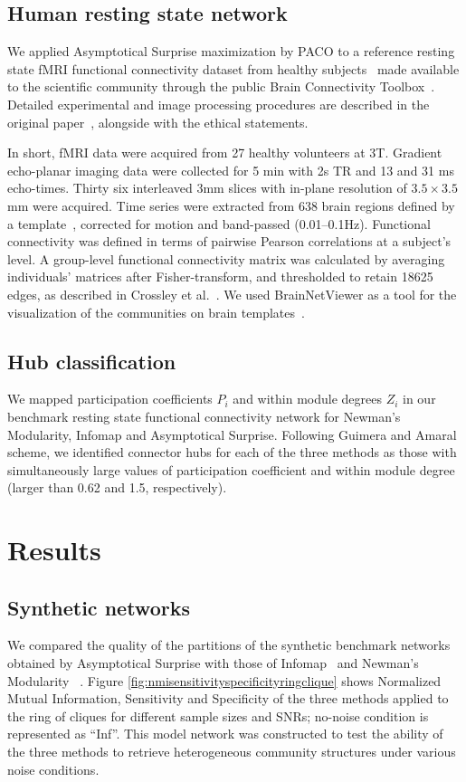 \subsection{Human resting state network}
We applied Asymptotical Surprise maximization by PACO to a reference resting state fMRI functional connectivity dataset from healthy subjects~\cite{crossley2013a} made available to the scientific community through the public Brain Connectivity Toolbox~\cite{rubinov2010}. 
Detailed experimental and image processing procedures are described in the original paper~\cite{crossley2013a}, alongside with the ethical statements.

In short, fMRI data were acquired from 27 healthy volunteers at 3T.
Gradient echo-planar imaging data were collected for 5 min with 2s TR and 13 and 31 ms echo-times. Thirty six interleaved 3mm slices with in-plane resolution of $3.5\times 3.5$ mm were acquired.
Time series were extracted from 638 brain regions defined by a template~\cite{crossley2013a}, corrected for motion and band-passed (0.01–0.1Hz). Functional connectivity was defined in terms of pairwise Pearson correlations at a subject's level.
A group-level functional connectivity matrix was calculated by averaging individuals' matrices after Fisher-transform, and thresholded to retain 18625 edges, as described in Crossley et al.~\cite{crossley2013a}.
We used BrainNetViewer as a tool for the visualization of the communities on brain templates~\cite{xia2013}.


\subsection{Hub classification}
We mapped participation coefficients $P_i$ and within module degrees $Z_i$ in our benchmark resting state functional connectivity network for Newman's Modularity, Infomap and Asymptotical Surprise. Following Guimera and Amaral scheme, we identified connector hubs for each of the three methods as those with simultaneously large values of participation coefficient and within module degree (larger than 0.62 and 1.5, respectively).

\section{Results}
\subsection{Synthetic networks}
We compared the quality of the partitions of the synthetic benchmark networks obtained by Asymptotical Surprise with those of Infomap~\cite{rosvall2008} and Newman's Modularity ~\cite{newman2006,blondel2008}. Figure \ref{fig:nmisensitivityspecificityringclique} shows Normalized Mutual Information, Sensitivity and Specificity of the three methods applied to the ring of cliques for different sample sizes and SNRs; no-noise condition is represented as ``Inf''.
This model network was constructed to test the ability of the three methods to retrieve heterogeneous community structures under various noise conditions.

